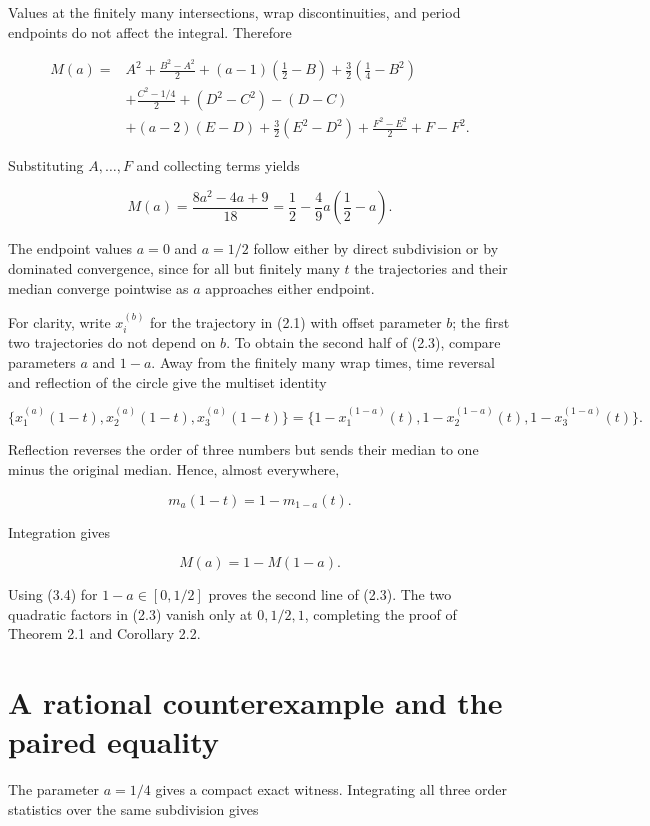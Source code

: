 \documentclass[11pt]{article}
\numberwithin{equation}{section}
\begin{document}
Values at the finitely many intersections, wrap discontinuities, and period
endpoints do not affect the integral. Therefore

\nopagebreak[4]
\[
\begin{aligned}
M(a)={}&A^2+\frac{B^2-A^2}{2}
 +(a-1)\left(\frac12-B\right)
 +\frac32\left(\frac14-B^2\right)\\
&+\frac{C^2-1/4}{2}
 +(D^2-C^2)-(D-C)\\
&+(a-2)(E-D)+\frac32(E^2-D^2)
 +\frac{F^2-E^2}{2}+F-F^2.
\end{aligned}
\tag{3.3}
\]

Substituting $A,\ldots,F$ and collecting terms yields

\nopagebreak[4]
\[
M(a)=\frac{8a^2-4a+9}{18}
=\frac12-\frac49a\left(\frac12-a\right).
\tag{3.4}
\]

The endpoint values $a=0$ and $a=1/2$ follow either by direct subdivision or
by dominated convergence, since for all but finitely many $t$ the trajectories
and their median converge pointwise as $a$ approaches either endpoint.

For clarity, write $x_i^{(b)}$ for the trajectory in (2.1) with offset
parameter $b$; the first two trajectories do not depend on $b$. To obtain the
second half of (2.3), compare parameters $a$ and $1-a$. Away
from the finitely many wrap times, time reversal and reflection of the circle
give the multiset identity

\nopagebreak[4]
\[
\{x_1^{(a)}(1-t),x_2^{(a)}(1-t),x_3^{(a)}(1-t)\}
=
\{1-x_1^{(1-a)}(t),1-x_2^{(1-a)}(t),1-x_3^{(1-a)}(t)\}.
\]

Reflection reverses the order of three numbers but sends their median to one
minus the original median. Hence, almost everywhere,

\nopagebreak[4]
\[
m_a(1-t)=1-m_{1-a}(t).
\tag{3.5}
\]

Integration gives

\nopagebreak[4]
\[
M(a)=1-M(1-a).
\tag{3.6}
\]

Using (3.4) for $1-a\in[0,1/2]$ proves the second line of (2.3). The two
quadratic factors in (2.3) vanish only at $0,1/2,1$, completing the proof of
Theorem 2.1 and Corollary 2.2.

\section{A rational counterexample and the paired equality}


The parameter $a=1/4$ gives a compact exact witness. Integrating all three
order statistics over the same subdivision gives
\end{document}
